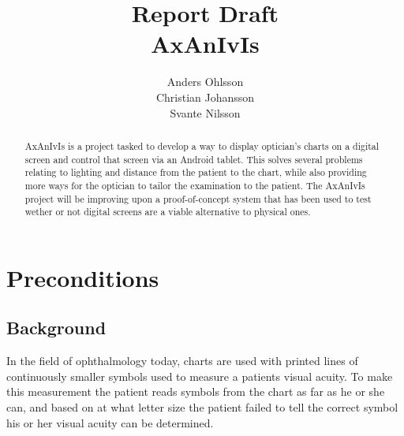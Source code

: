 \documentclass[12pt,a4paper,notitlepage]{report}
\begin{document}
\title{Report Draft\\AxAnIvIs}
\author{Anders Ohlsson\\ Christian Johansson\\ Svante Nilsson}
\maketitle
\begin{abstract}
AxAnIvIs is a project tasked to develop a way to display optician's charts on a digital screen and control that screen via an Android tablet. This solves several problems relating to lighting and distance from the patient to the chart, while also providing more ways for the optician to tailor the examination to the patient. The AxAnIvIs project will be improving upon a proof-of-concept system that has been used to test wether or not digital screens are a viable alternative to physical ones.
\end{abstract}
\thispagestyle{empty}
\clearpage

\setcounter{page}{1}
\chapter{Preconditions}

\section{Background}
In the field of ophthalmology today, charts are used with printed lines of continuously smaller symbols used to measure a patients visual acuity. To make this measurement the patient reads symbols from the chart as far as he or she can, and based on at what letter size the patient failed to tell the correct symbol his or her visual acuity can be determined. 

\end{document}
